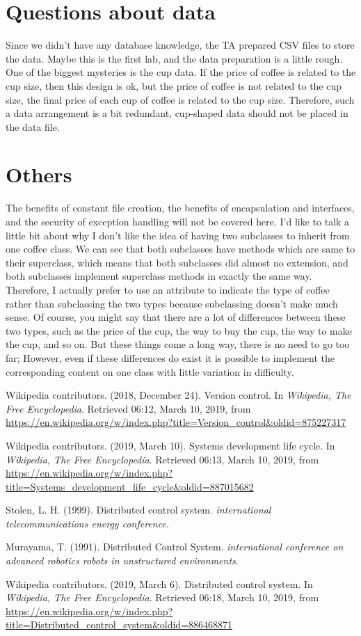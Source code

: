 \documentclass[a4paper]{report}
\begin{document}
\section{Questions about data}
Since we didn't have any database knowledge, the TA prepared CSV files to store the data.
Maybe this is the first lab, and the data preparation is a little rough. One of the biggest mysteries is the cup data.
If the price of coffee is related to the cup size, then this design is ok, but the price of coffee is not related to the cup size, the final price of each cup of coffee is related to the cup size.
Therefore, such a data arrangement is a bit redundant, cup-shaped data should not be placed in the data file.
\section{Others}
The benefits of constant file creation, the benefits of encapsulation and interfaces, and the security of exception handling will not be covered here.
I'd like to talk a little bit about why I don't like the idea of having two subclasses to inherit from one coffee class.
We can see that both subclasses have methods which are same to their superclass, which means that both subclasses did almost no extension, and both subclasses implement superclass methods in exactly the same way.
Therefore, I actually prefer to use an attribute to indicate the type of coffee rather than subclassing the two types because subclassing doesn't make much sense.
Of course, you might say that there are a lot of differences between these two types, such as the price of the cup, the way to buy the cup, the way to make the cup, and so on.
But these things come a long way, there is no need to go too far;
However, even if these differences do exist it is possible to implement the corresponding content on one class with little variation in difficulty.


\begin{thebibliography}{A}

Wikipedia contributors. (2018, December 24). Version control. In \emph{Wikipedia, The Free Encyclopedia}. Retrieved 06:12, March 10, 2019, from \url{https://en.wikipedia.org/w/index.php?title=Version_control&oldid=875227317}

Wikipedia contributors. (2019, March 10). Systems development life cycle. In \emph{Wikipedia, The Free Encyclopedia}. Retrieved 06:13, March 10, 2019, from \url{https://en.wikipedia.org/w/index.php?title=Systems_development_life_cycle&oldid=887015682}

Stolen, L. H. (1999). Distributed control system. \emph{international telecommunications energy conference.}

Murayama, T. (1991). Distributed Control System. \emph{international conference on advanced robotics robots in unstructured environments}.

Wikipedia contributors. (2019, March 6). Distributed control system. In \emph{Wikipedia, The Free Encyclopedia}. Retrieved 06:18, March 10, 2019, from \url{https://en.wikipedia.org/w/index.php?title=Distributed_control_system&oldid=886468871}

\end{thebibliography}
\end{document}
